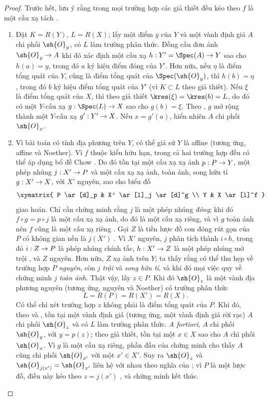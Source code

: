 \documentclass[oneside,10pt]{amsart}
\makeatletter
\newcommand{\ega@arrow}[2]{\mathchoice{#1}{#2}{#2}{#2}}
\renewcommand{\to}{\ega@arrow{\longrightarrow}{\rightarrow}}
\newcommand{\oldpage}[2][]{\marginnote{\normalfont\footnotesize\textbf{#1}~|~#2}\ignorespaces}
\makeatother
\begin{document}
\begin{proof}
Trước hết, lưu ý rằng trong mọi trường hợp các giả thiết đều kéo theo $f$ là một cấu xạ tách .
\begin{enumerate}
  \item[\rm{(i)}] Đặt $K=R(Y)$, $L=R(X)$; lấy một điểm $y$ của $Y$ và một vành định giá $A$ chi phối $\sh{O}_y$, có $L$ làm trường phân thức.
  Đồng cấu đơn ánh $\sh{O}_y\to A$ khi đó xác định một cấu xạ $h:Y'=\Spec(A)\to Y$  sao cho $h(a)=y$, trong đó $a$ ký hiệu điểm đóng của $Y'$.
  Hơn nữa, nếu $\eta$ là điểm tổng quát của $Y$, cũng là điểm tổng quát của $\Spec(\sh{O}_y)$, thì $h(b)=\eta$, trong đó $b$ ký hiệu điểm tổng quát của $Y'$ (vì $K\subset L$ theo giả thiết).
  Nếu $\xi$ là điểm tổng quát của $X$, thì theo giả thiết $\kres(\xi)=\kres(b)=L$, do đó có một $Y$-cấu xạ $g:\Spec(L)\to X$ sao cho $g(b)=\xi$.
  Theo , $g$ mở rộng thành một $Y$-cấu xạ $g':Y'\to X$.
  Nếu $x=g'(a)$, hiển nhiên $A$ chi phối $\sh{O}_x$.

  \item[\rm{(ii)}] Vì bài toán có tính địa phương trên $Y$, có thể giả sử $Y$ là affine (tương ứng, affine và Noether).
  Vì $f$ thuộc kiểu hữu hạn, trong cả hai trường hợp đều có thể áp dụng bổ đề Chow .
  Do đó tồn tại một cấu xạ xạ ảnh $p:P\to Y$, một phép nhúng $j:X'\to P$ và một cấu xạ xạ ảnh, toàn ánh, song hữu tỉ $g:X'\to X$, với $X'$ nguyên, sao cho biểu đồ
  \[
    \xymatrix{
      P \ar[d]_p
      & X' \ar[l]_j \ar[d]^g
      \\ Y
      & X \ar[l]^f
    }
  \]
  giao hoán.
  Chỉ cần chứng minh rằng $j$ là một phép nhúng \emph{đóng}; khi đó $f\circ g=p\circ j$ là một cấu xạ xạ ảnh, do đó là một cấu xạ riêng, và vì $g$ toàn ánh nên $f$ cũng là một cấu xạ riêng .
  Gọi $Z$ là tiền lược đồ con đóng rút gọn của $P$ có không gian nền là $\overline{j(X')}$ .
  Vì $X'$ nguyên, $j$ phân tích thành $i\circ h$, trong đó $i:Z\to P$ là phép nhúng chính tắc, $h:X'\to Z$ là một phép nhúng mở trội , và $Z$ nguyên.
\oldpage[II]{147}
  Hơn nữa, $Z$ xạ ảnh trên $Y$; ta thấy rằng có thể thu hẹp về trường hợp $P$ \emph{nguyên}, còn $j$ \emph{trội} và \emph{song hữu tỉ}, và khi đó mọi việc quy về chứng minh $j$ \emph{toàn ánh}.
  Thật vậy, lấy $z\in P$.
  Khi đó $\sh{O}_z$ là một vành địa phương nguyên (tương ứng, nguyên và Noether) có trường phân thức
  \[
    L=R(P)=R(X')=R(X).
  \]
  Có thể chỉ xét trường hợp $z$ không phải là điểm tổng quát của $P$.
  Khi đó, theo  và , tồn tại một vành định giá (tương ứng, một vành định giá rời rạc) $A$ chi phối $\sh{O}_z$ và có $L$ làm trường phân thức.
  \emph{A fortiori}, $A$ chi phối $\sh{O}_y$, với $y=p(z)$; theo giả thiết, tồn tại một $x\in X$ sao cho $A$ chi phối $\sh{O}_x$.
  Vì $g$ là một cấu xạ riêng, phần đầu của chứng minh cho thấy $A$ cũng chi phối $\sh{O}_{x'}$ với một $x'\in X'$.
  Suy ra $\sh{O}_z$ và $\sh{O}_{j(x')}=\sh{O}_{x'}$ liên hệ với nhau theo nghĩa của ; vì $P$ là một lược đồ, điều này kéo theo $z=j(x')$ , và chứng minh kết thúc.
\end{enumerate}
\end{proof}
\end{document}
